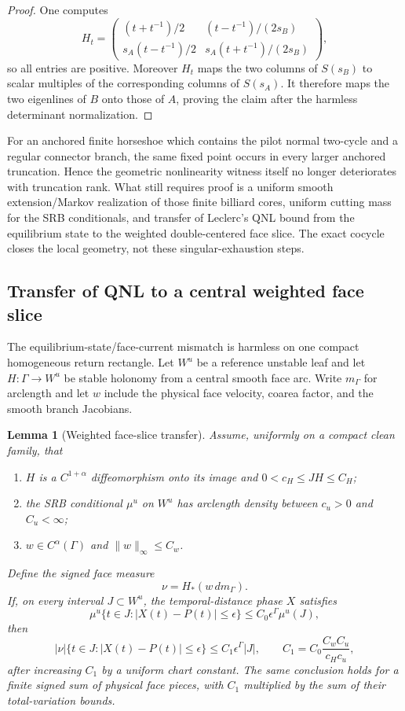 \documentclass[11pt]{article}
\newtheorem{lemma}[theorem]{Lemma}
\begin{document}
\begin{proof}
One computes
\[
 H_t=\begin{pmatrix}
 (t+t^{-1})/2 &(t-t^{-1})/(2s_B)\\
 s_A(t-t^{-1})/2&s_A(t+t^{-1})/(2s_B)
 \end{pmatrix},
\]
so all entries are positive.  Moreover $H_t$ maps the two columns of
$S(s_B)$ to scalar multiples of the corresponding columns of $S(s_A)$.
It therefore maps the two eigenlines of $B$ onto those of $A$, proving the
claim after the harmless determinant normalization.
\end{proof}

For an anchored finite horseshoe which contains the pilot normal two-cycle and a
regular connector branch, the same fixed point occurs in every larger
anchored truncation.  Hence the geometric nonlinearity witness itself no
longer deteriorates with truncation rank.  What still requires proof is a
uniform smooth extension/Markov realization of those finite billiard cores,
uniform cutting mass for the SRB conditionals, and transfer of Leclerc's QNL
bound from the equilibrium state to the weighted double-centered face slice.
The exact cocycle closes the local geometry, not these singular-exhaustion
steps.

\subsection{Transfer of QNL to a central weighted face slice}

The equilibrium-state/face-current mismatch is harmless on one compact
homogeneous return rectangle.  Let $W^u$ be a reference unstable leaf and let
$H:\Gamma\to W^u$ be stable holonomy from a central smooth face arc.  Write
$m_\Gamma$ for arclength and let $w$ include the physical face velocity,
coarea factor, and the smooth branch Jacobians.

\begin{lemma}[Weighted face-slice transfer]
\label{lem:weighted-face-qnl-transfer}
Assume, uniformly on a compact clean family, that
\begin{enumerate}[label=\textup{(\roman*)}]
\item $H$ is a $C^{1+\alpha}$ diffeomorphism onto its image and
      $0<c_H\le JH\le C_H$;
\item the SRB conditional $\mu^u$ on $W^u$ has arclength density between
      $c_u>0$ and $C_u<\infty$;
\item $w\in C^\alpha(\Gamma)$ and $\|w\|_\infty\le C_w$.
\end{enumerate}
Define the signed face measure
\[
 \nu=H_*(w\,dm_\Gamma).
\]
If, on every interval $J\subset W^u$, the temporal-distance phase $X$
satisfies
\[
 \mu^u\{t\in J:|X(t)-P(t)|\le\epsilon\}
 \le C_0\epsilon^\Gamma\mu^u(J),
\]
then
\[
 |\nu|\{t\in J:|X(t)-P(t)|\le\epsilon\}
 \le C_1\epsilon^\Gamma |J|,
 \qquad
 C_1=C_0\frac{C_wC_u}{c_Hc_u},
\]
after increasing $C_1$ by a uniform chart constant.  The same conclusion
holds for a finite signed sum of physical face pieces, with $C_1$ multiplied
by the sum of their total-variation bounds.
\end{lemma}
\end{document}
